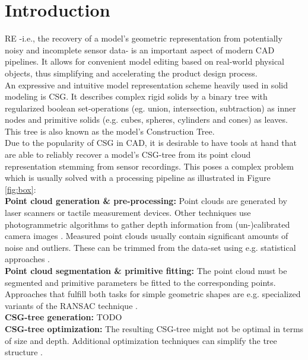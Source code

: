 \section{Introduction}
\ac{RE} -i.e., the recovery of a model's geometric representation from potentially noisy and incomplete sensor data- is an important aspect of modern \ac{CAD} pipelines. 
It allows for convenient model editing based on real-world physical objects, thus simplifying and accelerating the product design process.
\\
An expressive and intuitive model representation scheme heavily used in solid modeling is \ac{CSG}.
It describes complex rigid solids by a binary tree with regularized boolean set-operations (eg. union, intersection, subtraction) as inner nodes and primitive solids (e.g. cubes, spheres, cylinders and cones) as leaves. 
This tree is also known as the model's Construction Tree.
\\
Due to the popularity of \ac{CSG} in \ac{CAD}, it is desirable to have tools at hand that are able to reliably recover a model's \ac{CSG}-tree from its point cloud representation stemming from sensor recordings.
This poses a complex problem which is usually solved with a processing pipeline as illustrated in Figure \ref{fig:box}:  
\\
\textbf{Point cloud generation \& pre-processing:} Point clouds are generated by laser scanners or tactile measurement devices. 
Other techniques use photogrammetric algorithms to gather depth information from (un-)calibrated camera images \cite{hartley2003multiple}.
Measured point clouds usually contain significant amounts of noise and outliers. 
These can be trimmed from the data-set using e.g. statistical approaches  \cite{rusu20113d}.
\\
\textbf{Point cloud segmentation \& primitive fitting:} The point cloud must be segmented and primitive parameters be fitted to the corresponding points. Approaches that fulfill both tasks for simple geometric shapes are e.g. specialized variants of the \ac{RANSAC} technique \cite{schnabel2007efficient}.
\\
\textbf{\ac{CSG}-tree generation:} TODO
\\
\textbf {\ac{CSG}-tree optimization:} The resulting \ac{CSG}-tree might not be optimal in terms of size and depth.
Additional optimization techniques can simplify the tree structure \cite{weiss2009geometry, shapiro1991construction}. 	

